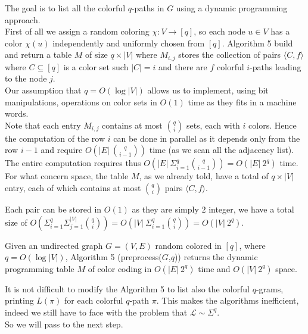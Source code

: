 The goal is to list all the colorful $q$-paths in $G$ using a dynamic programming approach.\\

First of all we assign a random coloring $\chi : V \rightarrow [q]$, so each node $u \in V$ has a color $\chi(u)$ independently and uniformly chosen from $[q]$.
Algorithm 5 build and return a table $M$ of size $q \times |V|$ 
where $M_{i,j}$ stores the collection of pairs $\langle C, f \rangle$ where  $C \subseteq [q]$ is a color set such $|C| = i$ and there are $f$ colorful $i$-paths leading to the node $j$.\\

Our assumption that $q = O(\log |V|)$ allows us to implement, using bit manipulations, operations on color sets in $O(1)$ time as they fits in a machine words.\\

Note that each entry $M_{i, j}$ contains at most $\binom{q}{i}$ sets, each with $i$ colors.
Hence the computation of the row $i$ can be done in parallel as it depends only from the row $i-1$ and require $O(|E|\ \binom{q}{i-1})$ time (as we scan all the adjacency list).
The entire computation requires thus $O(|E|\ \Sigma_{i=1}^{q}{\binom{q}{i-1}}) = O(|E|\ 2^{q})$ time.\\

For what concern space, the table $M$, as we already told, have a total of $q \times |V|$ entry, each of which contains at most $\binom{q}{i}$ pairs $\langle C, f \rangle$.

Each pair can be stored in $O(1)$ as they are simply $2$ integer, we have a total size of $O(\Sigma_{i=1}^{q}{\Sigma_{j=1}^{|V|}{ \binom{q}{i}}}) = O(|V|\ \Sigma_{i=1}^{q}{\binom{q}{i}}) = O(|V|\ 2^{q})$.

\begin{lemma}
	Given an undirected graph $G=(V, E)$ random colored in $[q]$, where $q = O(\log |V|)$, Algorithm 5 (preprocess($G$,$q$))
	returns the dynamic programming table $M$ of color coding in $O(|E|\ 2^{q})$ time and $O(|V|\ 2^{q})$ space. 
\end{lemma}

It is not difficult to modify the Algorithm 5 to list also the colorful $q$-grams, printing $L(\pi)$ for each colorful $q$-path $\pi$.
This makes the algorithms inefficient, indeed we still have to face with the problem that $\mathcal{L} \sim \Sigma^{q}$. \\

So we will pass to the next step.

